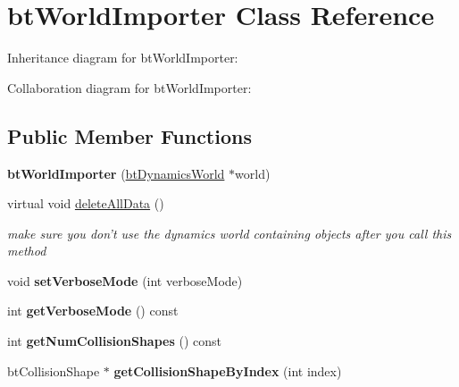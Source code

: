 \hypertarget{classbt_world_importer}{\section{bt\+World\+Importer Class Reference}
\label{classbt_world_importer}
}


Inheritance diagram for bt\+World\+Importer\+:


Collaboration diagram for bt\+World\+Importer\+:
\subsection*{Public Member Functions}
\begin{DoxyCompactItemize}
\item 
\hypertarget{classbt_world_importer_a8c11527c80f69a03cea9e5188f0bcdc0}{{\bfseries bt\+World\+Importer} (\hyperlink{classbt_dynamics_world}{bt\+Dynamics\+World} $\ast$world)}\label{classbt_world_importer_a8c11527c80f69a03cea9e5188f0bcdc0}

\item 
virtual void \hyperlink{classbt_world_importer_a773cba2bf22bbe5e62f27c0c37b89585}{delete\+All\+Data} ()
\begin{DoxyCompactList}\small\item\em make sure you don't use the dynamics world containing objects after you call this method \end{DoxyCompactList}\item 
\hypertarget{classbt_world_importer_aa290d693dc056d0609d28748bb37d57d}{void {\bfseries set\+Verbose\+Mode} (int verbose\+Mode)}\label{classbt_world_importer_aa290d693dc056d0609d28748bb37d57d}

\item 
\hypertarget{classbt_world_importer_aa3cb95b43bec80c927bcab35f46f2f62}{int {\bfseries get\+Verbose\+Mode} () const }\label{classbt_world_importer_aa3cb95b43bec80c927bcab35f46f2f62}

\item 
\hypertarget{classbt_world_importer_a33847b0ed82f7a786c75619975731bdd}{int {\bfseries get\+Num\+Collision\+Shapes} () const }\label{classbt_world_importer_a33847b0ed82f7a786c75619975731bdd}

\item 
\hypertarget{classbt_world_importer_a38c9a86659bc5afa6c94ed1e76a22f0e}{bt\+Collision\+Shape $\ast$ {\bfseries get\+Collision\+Shape\+By\+Index} (int index)}\label{classbt_world_importer_a38c9a86659bc5afa6c94ed1e76a22f0e}


\end{DoxyCompactItemize}
